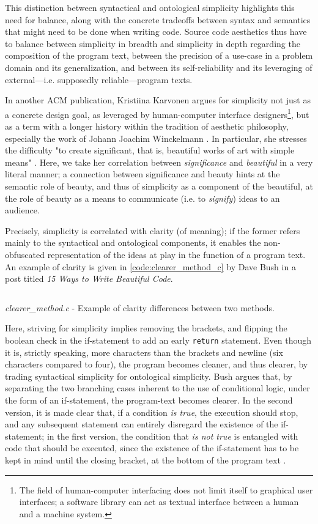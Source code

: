 This distinction between syntactical and ontological simplicity highlights this need for balance, along with the concrete tradeoffs between syntax and semantics that might need to be done when writing code. Source code aesthetics thus have to balance between simplicity in breadth and simplicity in depth regarding the composition of the program text, between the precision of a use-case in a problem domain and its generalization, and between its self-reliability and its leveraging of external—i.e. supposedly reliable—program texts. 

In another ACM publication, Kristiina Karvonen argues for simplicity not just as a concrete design goal, as leveraged by human-computer interface designers\footnote{The field of human-computer interfacing does not limit itself to graphical user interfaces; a software library can act as textual interface between a human and a machine system.}, but as a term with a longer history within the tradition of aesthetic philosophy, especially the work of Johann Joachim Winckelmann \citep{karvonen_beauty_2000}. In particular, she stresses the difficulty "to create significant, that is, beautiful works of art with simple means" \citep{karvonen_beauty_2000}. Here, we take her correlation between \emph{significance} and \emph{beautiful} in a very literal manner; a connection between significance and beauty hints at the semantic role of beauty, and thus of simplicity as a component of the beautiful, at the role of beauty as a means to communicate (i.e. to \emph{signify}) ideas to an audience.

Precisely, simplicity is correlated with clarity (of meaning); if the former refers mainly to the syntactical and ontological components, it enables the non-obfuscated representation of the ideas at play in the function of a program text. An example of clarity is given in \autoref{code:clearer_method_c} by Dave Bush in a post titled  \emph{15 Ways to Write Beautiful Code}.

\begin{listing}
  \inputminted{c}{./corpus/clearer_method.c}
  \caption{\emph{clearer\_method.c} - Example of clarity differences between two methods.}
  \label{code:clearer_method_c}
\end{listing}

Here, striving for simplicity implies removing the brackets, and flipping the boolean check in the if-statement to add an early \lstinline{return} statement. Even though it is, strictly speaking, more characters than the brackets and newline (six characters compared to four), the program becomes cleaner, and thus clearer, by trading syntactical simplicity for ontological simplicity. Bush argues that, by separating the two branching cases inherent to the use of conditional logic, under the form of an if-statement, the program-text becomes clearer. In the second version, it is made clear that, if a condition \emph{is true}, the execution should stop, and any subsequent statement can entirely disregard the existence of the if-statement; in the first version, the condition that \emph{is not true} is entangled with code that should be executed, since the existence of the if-statement has to be kept in mind until the closing bracket, at the bottom of the program text \citep{bush_15_2015}.

